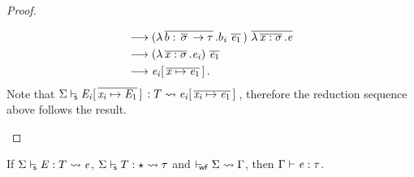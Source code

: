 \begin{proof}
\begin{description}
\begin{align*}
            & \longrightarrow   (  \lambda  \,\overline{  b  :  \,\overline{  \sigma  }\,  \rightarrow  \tau  }\,  .  b_{\mathit{i}} \, \,\overline{  \mathit{e_{{\mathrm{1}}}}  }\,  ) \, \,\overline{  \lambda  \,\overline{  \mathit{x}  :  \sigma  }\,  .  \mathit{e}  }\, \\
            & \longrightarrow   (  \lambda  \,\overline{  \mathit{x}  :  \sigma  }\,  .  \mathit{e_{\mathit{i}}}  ) \, \,\overline{  \mathit{e_{{\mathrm{1}}}}  }\, \\
            & \longrightarrow   \mathit{e_{\mathit{i}}}  [  \,\overline{  \mathit{x}  \mapsto  \mathit{e_{{\mathrm{1}}}}  }\,  ] \,.
        \end{align*}
        Note that $ \Sigma  \vdash_{\!\!\mathsf{s} }  \mathit{E_{\mathit{i}}}  [  \,\overline{  \mathit{x_{\mathit{i}}}  \mapsto  \mathit{E_{{\mathrm{1}}}}  }\,  ] \,  :  T   \rightsquigarrow   \mathit{e_{\mathit{i}}}  [  \,\overline{  \mathit{x_{\mathit{i}}}  \mapsto  \mathit{e_{{\mathrm{1}}}}  }\,  ] \, $, therefore the reduction sequence above follows the result.
    \end{description}
\end{proof}

\begin{lem}
If $ \Sigma  \vdash_{\!\!\mathsf{s} }  \mathit{E}  :  T   \rightsquigarrow   \mathit{e} $, $ \Sigma  \vdash_{\!\!\mathsf{s} }  T  :  \star   \rightsquigarrow   \tau $ and $ \vdash_{\!\!\mathsf{wf} }  \Sigma   \rightsquigarrow   \Gamma $, then $\Gamma  \vdash  \mathit{e}  :  \tau$.
\end{lem}

